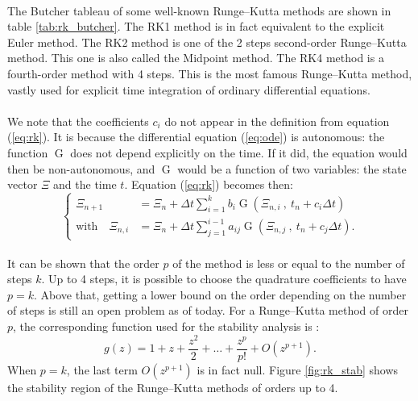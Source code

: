        \paragraph{}
        The Butcher tableau of some well-known Runge--Kutta methods are shown in table \ref{tab:rk_butcher}.
        The RK1 method is in fact equivalent to the explicit Euler method.
        The RK2 method is one of the 2 steps second-order Runge--Kutta method.
        This one is also called the Midpoint method.
        The RK4 method is a fourth-order method with 4 steps.
        This is the most famous Runge--Kutta method, vastly used for explicit time integration of ordinary differential equations.

        \paragraph{}
        We note that the coefficients $c_i$ do not appear in the definition from equation (\ref{eq:rk}).
        It is because the differential equation (\ref{eq:ode}) is autonomous: the function $\operatorname{G}$ does not depend explicitly on the time.
        If it did, the equation would then be non-autonomous, and $\operatorname{G}$ would be a function of two variables: the state vector $\Xi$ and the time $t$.
        Equation (\ref{eq:rk}) becomes then:
        \begin{equation}
          \left\{\begin{aligned}
            \Xi_{n+1} &= \Xi_n + \Delta t \sum_{i = 1}^k b_i \operatorname{G}\left(\Xi_{n,i} \ ,\  t_n + c_i \Delta t\right) \\
            \textrm{with}\quad \Xi_{n,i} &= \Xi_n + \Delta t \sum_{j = 1}^{i-1} a_{ij} \operatorname{G}\left(\Xi_{n,j} \ ,\  t_n + c_j \Delta t\right) .
          \end{aligned}\right.
        \end{equation}

        \paragraph{}
        It can be shown that the order $p$ of the method is less or equal to the number of steps $k$.
        Up to 4 steps, it is possible to choose the quadrature coefficients to have $p = k$.
        Above that, getting a lower bound on the order depending on the number of steps is still an open problem as of today.
        For a Runge--Kutta method of order $p$, the corresponding function used for the stability analysis is \cite{HairerWanner1996}:
        \begin{equation}
          g\left(z\right) = 1 + z + \frac{z^2}{2} + \dots + \frac{z^p}{p!} + O\left(z^{p+1}\right) .
        \end{equation}
        When $p = k$, the last term $O\left(z^{p+1}\right)$ is in fact null.
        Figure \ref{fig:rk_stab} shows the stability region of the Runge--Kutta methods of orders up to 4.

